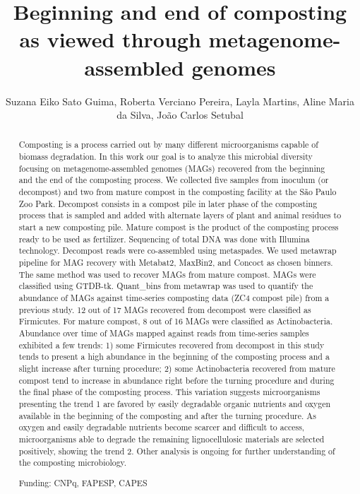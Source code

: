 \documentclass[twoside]{article}
\title{\vspace{-15mm}\fontsize{24pt}{10pt}\selectfont\textbf{ Beginning and end of composting as viewed through metagenome-assembled genomes }} %
\author{ Suzana Eiko Sato Guima, Roberta Verciano Pereira, Layla Martins, Aline Maria da Silva, Jo\~ao Carlos Setubal }
\affil{ Programa Interunidades de P\'os Gradua\c{c}\~ao em Bioinform\'atica,  Universidade de S\~ao Paulo (USP) }
\date{}
\begin{document}
  
  
  \maketitle %
  
  
  \thispagestyle{fancy} %
  
  
  \begin{abstract}
  Composting is a process carried out by many different microorganisms capable of biomass degradation. In this work our goal is to analyze this microbial diversity focusing on metagenome-assembled genomes (MAGs) recovered from the beginning and the end of the composting process. We collected five samples from inoculum (or decompost) and two from mature compost in the composting facility at the S\~ao Paulo Zoo Park. Decompost consists in a compost pile in later phase of the composting process that is sampled and added with alternate layers of plant and animal residues to start a new composting pile. Mature compost is the product of the composting process ready to be used as fertilizer. Sequencing of total DNA was done with Illumina technology. Decompost reads were co-assembled using metaspades. We used metawrap pipeline for MAG recovery with Metabat2,  MaxBin2,  and Concoct as chosen binners. The same method was used to recover MAGs from mature compost. MAGs were classified using GTDB-tk. Quant\_bins from metawrap was used to quantify the abundance of MAGs against time-series composting data (ZC4 compost pile) from a previous study. 12 out of 17 MAGs recovered from decompost were classified as Firmicutes. For mature compost,  8 out of 16 MAGs were classified as Actinobacteria. Abundance over time of MAGs mapped against reads from time-series samples exhibited a few trends: 1) some Firmicutes recovered from decompost in this study tends to present a high abundance in the beginning of the composting process and a slight increase after turning procedure; 2) some Actinobacteria recovered from mature compost tend to increase in abundance right before the turning procedure and during the final phase of the composting process. This variation suggests microorganisms presenting the trend 1 are favored by easily degradable organic nutrients and oxygen available in the beginning of the composting and after the turning procedure.  As oxygen and easily degradable nutrients become scarcer and difficult to access,  microorganisms able to degrade the remaining lignocellulosic materials are selected positively,  showing the trend 2. Other analysis is ongoing for further understanding of the composting microbiology.
  
  Funding: CNPq,  FAPESP,  CAPES \\ 
  \end{abstract}
  
\end{document}
